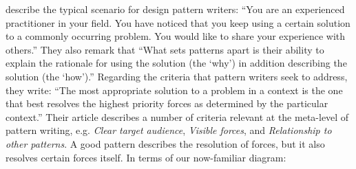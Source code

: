  describe the typical scenario for design
pattern writers: ``You are an experienced practitioner in your
field. You have noticed that you keep using a certain solution to a
commonly occurring problem. You would like to share your experience
with others.''  They also remark that ``What sets patterns apart is
their ability to explain the rationale for using the solution (the
`why') in addition describing the solution (the `how').''  Regarding
the criteria that pattern writers seek to address, they write: ``The
most appropriate solution to a problem in a context is the one that
best resolves the highest priority forces as determined by the
particular context.''  Their article describes a number of criteria
relevant at the meta-level of pattern writing, e.g. \emph{Clear target
  audience}, \emph{Visible forces}, and \emph{Relationship to other
  patterns}.  A good pattern describes the resolution of forces, but
it also resolves certain forces itself.  In terms of our now-familiar
diagram:



